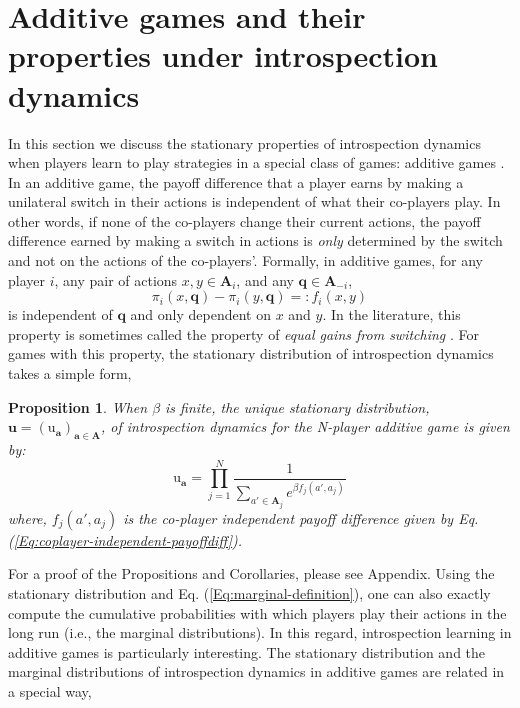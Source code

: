 \documentclass[11pt]{article}
\theoremstyle{plainCl1}
\newtheorem{Prop}{Proposition}
\theoremstyle{plainCl2}
\newcommand{\A}{\mathbf{A}}
\newcommand{\abf}{\mathbf{a}}
\newcommand{\qbf}{\mathbf{q}}
\newcommand{\ubf}{\mathbf{u}}
\begin{document}
\section*{Additive games and their properties under introspection dynamics}
In this section we discuss the stationary properties of introspection dynamics when players learn to play strategies in a special class of games: additive games \cite{McAvoy:PlosCB:2015, Pena:JTB:2014}. In an additive game, the payoff difference that a player earns by making a unilateral switch in their actions is independent of what their co-players play. In other words, if none of the co-players change their current actions, the payoff difference earned by making a switch in actions is \emph{only} determined by the switch and not on the actions of the co-players'. Formally, in additive games, for any player $i$, any pair of actions $x,y \in \A_i$, and any $\qbf \in \A_{-i}$,
\begin{equation}
\pi_i(x, \qbf) - \pi_i(y, \qbf) =: f_i(x,y) 
\label{Eq:coplayer-independent-payoffdiff}
\end{equation}
\noindent is independent of $\qbf$ and only dependent on $x$ and $y$. In the literature, this property is sometimes called the property of \emph{equal gains from switching} \cite{Pena:JTB:2014}. For games with this property, the stationary distribution of introspection dynamics takes a simple form,

 \begin{Prop}
When $\beta$ is finite, the unique stationary distribution, $\ubf = (\mathrm{u}_\abf)_{\abf \in \A}$, of introspection dynamics for the N-player additive game is given by: 
\begin{equation}
\mathrm{u}_\abf = \prod_{j=1}^N \frac{1}{\displaystyle \sum_{a' \in \A_j} e^{\beta f_j(a', a_j)}} 
\label{Eq:additive-game-stationary-distribution}
\end{equation}
where, $f_j(a', a_j)$ is the co-player independent payoff difference given by Eq. (\ref{Eq:coplayer-independent-payoffdiff}).

\label{Th:additive-games-stationary-dist}
\end{Prop}
\noindent For a proof of the Propositions and Corollaries, please see Appendix. Using the stationary distribution and Eq. (\ref{Eq:marginal-definition}), one can also exactly compute the cumulative probabilities with which players play their actions in the long run (i.e., the marginal distributions). In this regard, introspection learning in additive games is particularly interesting. The stationary distribution and the marginal distributions of introspection dynamics in additive games are related in a special way, 
\end{document}
